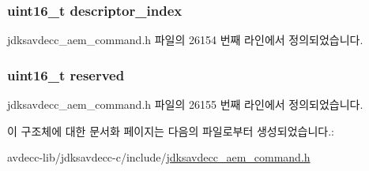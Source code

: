 \subsubsection[{\texorpdfstring{descriptor\+\_\+index}{descriptor_index}}]{\setlength{\rightskip}{0pt plus 5cm}uint16\+\_\+t descriptor\+\_\+index}\hypertarget{structjdksavdecc__aem__command__get__as__path__response_a042bbc76d835b82d27c1932431ee38d4}{}\label{structjdksavdecc__aem__command__get__as__path__response_a042bbc76d835b82d27c1932431ee38d4}


jdksavdecc\+\_\+aem\+\_\+command.\+h 파일의 26154 번째 라인에서 정의되었습니다.

\subsubsection[{\texorpdfstring{reserved}{reserved}}]{\setlength{\rightskip}{0pt plus 5cm}uint16\+\_\+t reserved}\hypertarget{structjdksavdecc__aem__command__get__as__path__response_a5a6ed8c04a3db86066924b1a1bf4dad3}{}\label{structjdksavdecc__aem__command__get__as__path__response_a5a6ed8c04a3db86066924b1a1bf4dad3}


jdksavdecc\+\_\+aem\+\_\+command.\+h 파일의 26155 번째 라인에서 정의되었습니다.



이 구조체에 대한 문서화 페이지는 다음의 파일로부터 생성되었습니다.\+:\begin{DoxyCompactItemize}
\item 
avdecc-\/lib/jdksavdecc-\/c/include/\hyperlink{jdksavdecc__aem__command_8h}{jdksavdecc\+\_\+aem\+\_\+command.\+h}\end{DoxyCompactItemize}
